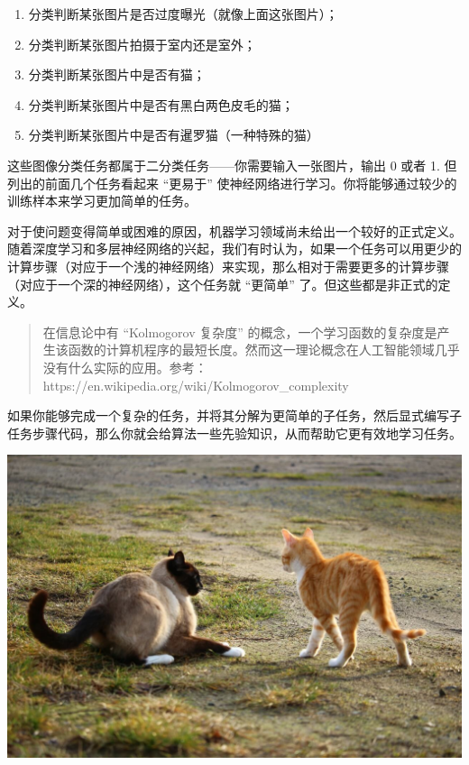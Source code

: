 \begin{enumerate}
\def\labelenumi{\arabic{enumi}.}
\tightlist
\item
  分类判断某张图片是否过度曝光（就像上面这张图片）；
\item
  分类判断某张图片拍摄于室内还是室外；
\item
  分类判断某张图片中是否有猫；
\item
  分类判断某张图片中是否有黑白两色皮毛的猫；
\item
  分类判断某张图片中是否有暹罗猫（一种特殊的猫）
\end{enumerate}

这些图像分类任务都属于二分类任务------你需要输入一张图片，输出 0 或者 1.
但列出的前面几个任务看起来 ``更易于''
使神经网络进行学习。你将能够通过较少的训练样本来学习更加简单的任务。

对于使问题变得简单或困难的原因，机器学习领域尚未给出一个较好的正式定义。随着深度学习和多层神经网络的兴起，我们有时认为，如果一个任务可以用更少的计算步骤（对应于一个浅的神经网络）来实现，那么相对于需要更多的计算步骤（对应于一个深的神经网络），这个任务就
``更简单'' 了。但这些都是非正式的定义。

\begin{quote}
在信息论中有 ``Kolmogorov 复杂度''
的概念，一个学习函数的复杂度是产生该函数的计算机程序的最短长度。然而这一理论概念在人工智能领域几乎没有什么实际的应用。参考：https://en.wikipedia.org/wiki/Kolmogorov\_complexity
\end{quote}

如果你能够完成一个复杂的任务，并将其分解为更简单的子任务，然后显式编写子任务步骤代码，那么你就会给算法一些先验知识，从而帮助它更有效地学习任务。

\includegraphics{./img/ch51_03.png}

